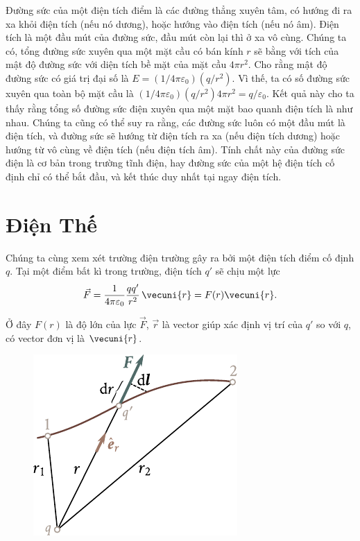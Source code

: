 Đường sức của một điện tích điểm là các đường thẳng xuyên tâm, có hướng đi ra xa khỏi điện tích (nếu nó dương), hoặc hướng vào điện tích (nếu nó âm). Điện tích là một đầu mút của đường sức, đầu mút còn lại thì ở xa vô cùng. Chúng ta có, tổng đường sức xuyên qua một mặt cầu có bán kính $r$ sẽ bằng với tích của mật độ đường sức với diện tích bề mặt của mặt cầu $4\pi r^2$. Cho rằng mật độ đường sức có giá trị đại số là $E=(1/4\pi\varepsilon_0)(q/r^2)$. Vì thế, ta có số đường sức xuyên qua toàn bộ mặt cầu là $(1/4\pi\varepsilon_0)(q/r^2) 4\pi r^2=q/\varepsilon_0$. Kết quả này cho ta thấy rằng tổng số đường sức điện xuyên qua một mặt bao quanh điện tích là như nhau. Chúng ta cũng có thể suy ra rằng, các đường sức luôn có một đầu mút là điện tích, và đường sức sẽ hướng từ điện tích ra xa (nếu điện tích dương) hoặc hướng từ vô cùng về điện tích (nếu điện tích âm). Tính chất này của đường sức điện là cơ bản trong trường tĩnh điện, hay đường sức của một hệ điện tích cố định chỉ có thể bắt đầu, và kết thúc duy nhất tại ngay điện tích.

\section{Điện Thế}\label{sec:1_6}

Chúng ta cùng xem xét trường điện trường gây ra bởi một điện tích điểm cố định $q$. Tại một điểm bất kì trong trường, điện tích $q'$ sẽ chịu một lực
\begin{equation}\label{eq:1_20}
	\vec{F} = \frac{1}{4\pi\varepsilon_0}\frac{qq'}{r^2}\, \vecuni{r} = F(r)\vecuni{r}.
\end{equation}

\noindent
Ở đây $F(r)$ là độ lớn của lực $\vec{F}$, $\vec{r}$ là vector giúp xác định vị trí của $q'$ so với $q$, có vector đơn vị là $\vecuni{r}$.

\begin{figure}[!htb]
	\begin{center}
		\includegraphics[scale=1]{figures/ch_01/fig_1_7.pdf}
		\caption[]{}
		\label{fig:1_7}
	\end{center}
	\vspace{-0.8cm}
\end{figure}


